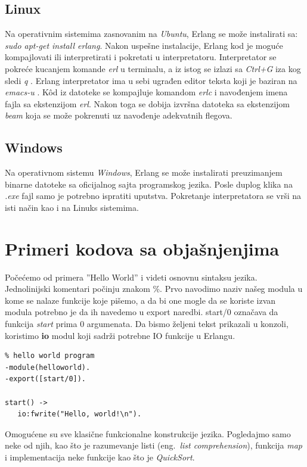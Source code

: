 \documentclass[a4paper]{article}
\begin{document}
{\subsection{Linux}
\label{subsec:instalacijaLinux}
Na operativnim sistemima zasnovanim na {\em Ubuntu}, Erlang se može instalirati sa:
{\em sudo apt-get install erlang}. 
Nakon uspešne instalacije, Erlang kod je moguće kompajlovati
ili interpretirati i pokretati u interpretatoru.
Interpretator se pokreće kucanjem komande {\em erl} u terminalu, a iz istog
se izlazi sa {\em Ctrl+G} iza kog sledi {\em q} \cite{book_joe}.
Erlang interpretator ima u sebi ugrađen editor teksta koji je baziran na {\em emacs-u} \cite{book_fred}.
K\^od iz datoteke se kompajluje komandom {\em erlc} i navođenjem imena fajla sa ekstenzijom {\em erl}.
Nakon toga se dobija izvršna datoteka sa ekstenzijom {\em beam} koja se može
pokrenuti uz navođenje adekvatnih flegova. 


\subsection{Windows}
\label{subsec:instalacijaWindows}
Na operativnom sistemu {\em Windows}, Erlang se može instalirati preuzimanjem binarne datoteke sa oficijalnog sajta \cite{sajt} programskog jezika. Posle duplog klika na {\em .exe} fajl samo je potrebno ispratiti uputstva. Pokretanje interpretatora se vrši na isti način kao i na Linuks sistemima.


\section{Primeri kodova sa objašnjenjima}
\label{sec:primeri}
Počećemo od primera ''Hello World'' i videti osnovnu sintaksu jezika. 
Jednolinijski komentari počinju znakom \%. 
Prvo navodimo naziv našeg modula u kome se nalaze funkcije koje pišemo, 
a da bi one mogle da se koriste izvan modula potrebno je da ih navedemo u export naredbi. start/0 označava da funkcija \textit{start} prima 0 argumenata.
Da bismo željeni tekst prikazali u konzoli, koristimo \textbf{io} modul koji sadrži potrebne IO funkcije u Erlangu.
\begin{verbatim}
% hello world program
-module(helloworld). 
-export([start/0]). 

start() -> 
   io:fwrite("Hello, world!\n").

\end{verbatim}

Omogućene su sve klasične funkcionalne konstrukcije jezika. 
Pogledajmo samo neke od njih, kao što je razumevanje listi (eng.~{\em list comprehension}), funkcija {\em map} i implementacija neke funkcije kao što je {\em QuickSort}.\\

}
\end{document}
